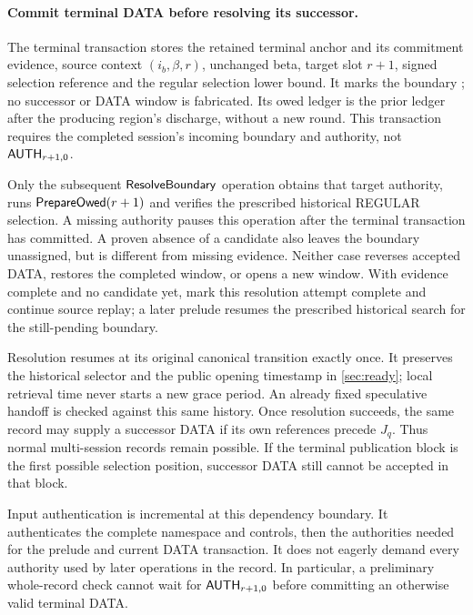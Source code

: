 \paragraph{Commit terminal DATA before resolving its successor.}
\label{sec:terminal-commit}
The terminal transaction stores the retained terminal anchor and its
commitment evidence, source context $(i_b,\beta,r)$, unchanged beta,
target slot $r+1$, signed selection reference and the regular selection
lower bound. It marks the boundary ; no
successor or DATA window is fabricated. Its owed ledger is the prior
ledger after the producing region's discharge, without a new round.
This transaction requires the completed session's incoming boundary
and authority, not $\mathsf{AUTH}_{r+1,0}$.

Only the subsequent $\mathsf{ResolveBoundary}$ operation obtains that
target authority, runs $\mathsf{PrepareOwed}(r+1)$ and verifies the
prescribed historical REGULAR selection. A missing authority pauses
this operation after the terminal transaction has committed. A proven
absence of a candidate also leaves the boundary unassigned, but is
different from missing evidence. Neither case reverses accepted DATA,
restores the completed window, or opens a new window.
With evidence complete and no candidate yet, mark this resolution
attempt complete and continue source replay; a later prelude resumes
the prescribed historical search for the still-pending boundary.

Resolution resumes at its original canonical transition exactly once.
It preserves the historical selector and the public opening timestamp
in \cref{sec:ready}; local retrieval time never starts a new grace
period. An already fixed speculative handoff is checked against this
same history. Once resolution succeeds, the same record may supply a
successor DATA if its own references precede $J_q$. Thus normal
multi-session records remain possible. If the terminal publication
block is the first possible selection position, successor DATA still
cannot be accepted in that block.

Input authentication is incremental at this dependency boundary. It
authenticates the complete namespace and controls, then the authorities
needed for the prelude and current DATA transaction. It does not eagerly
demand every authority used by later operations in the record. In
particular, a preliminary whole-record check cannot wait for
$\mathsf{AUTH}_{r+1,0}$ before committing an otherwise valid terminal DATA.

